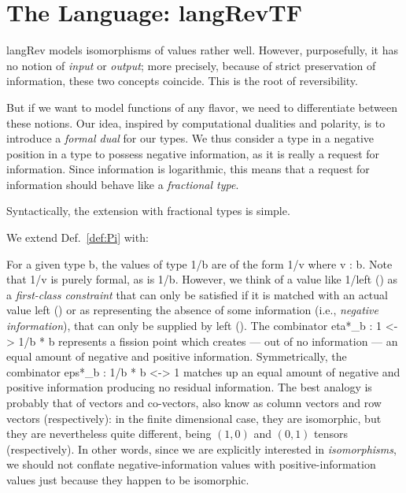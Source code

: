 \documentclass{llncs}
\begin{document}
\section{The Language: {{langRevTF}} }

{{langRev}} models isomorphisms of values rather well.  However, purposefully,
it has no notion of \emph{input} or \emph{output}; more precisely, because
of strict preservation of information, these two concepts coincide.  This
is the root of reversibility.

But if we want to model functions of any flavor, we need to differentiate
between these notions.  Our idea, inspired by computational dualities and
polarity, is to introduce a \emph{formal dual} for our types.  We thus
consider a type in a negative position in a type to possess negative
information, as it is really a request for information.  Since information
is logarithmic, this means that a request for information should behave
like a \emph{fractional type}.

Syntactically, the extension with fractional types is simple. 

\begin{definition}
\label{def:langRevT}
We extend Def.~\ref{def:Pi} with:
%
\end{definition}

For a given type {{b}}, the values of type {{1/b}} are of the form {{1/v}}
where {{v : b}}. Note that {{1/v}} is purely formal, as is {{1/b}}.
However, we think of a value like {{1/left ()}} as a
\emph{first-class constraint} that can only be satisfied if it is matched
with an actual value {{left ()}} or as representing the absence of some
information (i.e., \emph{negative information}), that can only be supplied by
{{left ()}}. The combinator {{eta*_b : 1 <-> 1/b * b}} represents a fission
point which creates --- out of no information --- an equal amount of negative
and positive information. Symmetrically, the combinator 
{{eps*_b : 1/b * b <-> 1}} matches up an equal amount of negative and positive
information producing no residual information.  The best analogy is probably
that of vectors and
co-vectors, also know as column vectors and row vectors (respectively): in
the finite dimensional case, they are isomorphic, but they are nevertheless
quite different, being $(1,0)$ and $(0,1)$ tensors (respectively).  In
other words, since we are explicitly interested in \emph{isomorphisms}, 
we should not conflate negative-information values with positive-information
values just because they happen to be isomorphic.
\end{document}
